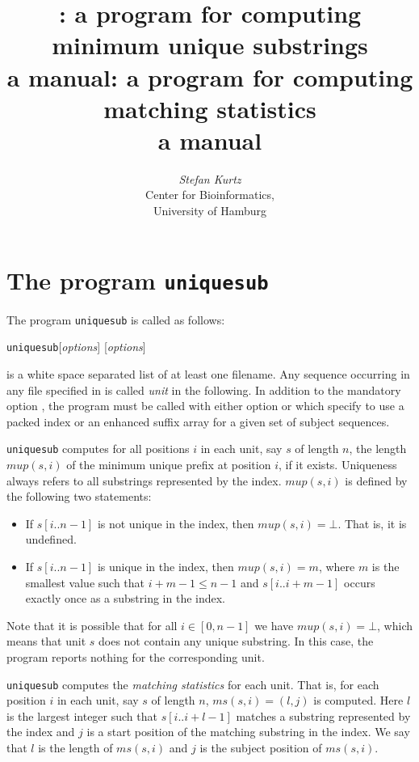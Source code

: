 \documentclass[12pt]{article}
\title{\Program: a program for computing\\
       minimum unique substrings\\
       a manual}
\title{\Program: a program for computing\\
       matching statistics\\
       a manual}
\author{\begin{tabular}{c}
         \textit{Stefan Kurtz}\\
         Center for Bioinformatics,\\
         University of Hamburg
        \end{tabular}}
\newcommand{\Substring}[3]{#1[#2..#3]}
\newcommand{\Program}[0]{\texttt{uniquesub}\xspace}
\newcommand{\Mup}[1]{\mathit{mup(s,#1)}}
\newcommand{\Program}[0]{\texttt{matstat}\xspace}
\newcommand{\MS}[1]{\mathit{ms(s,#1)}}
\begin{document}
\maketitle

\section{The program \Program}

The program \Program is called as follows:
\par
\noindent\Program [\textit{options}]   [\textit{options}] 
\par
{} is a white space separated list of at least one 
filename. Any sequence occurring in any file specified in 
is called \textit{unit} in the following.
In addition to the mandatory option , the program
must be called with either option  or 
which specify to use a packed index or an enhanced suffix array for 
a given set of subject sequences.

\begin{AboutUniquesub}
\Program computes for all positions \(i\) in each unit, say \(s\) of length
\(n\), the length \(\Mup{i}\) of the minimum unique prefix 
at position \(i\), if it exists. Uniqueness always refers to all substrings
represented by the index. \(\Mup{i}\) is defined by the following two 
statements:
\begin{itemize}
\item
If \(\Substring{s}{i}{n-1}\) is not unique in the index, then \(\Mup{i}=\bot\).
That is, it is undefined.
\item
If \(\Substring{s}{i}{n-1}\) is unique in the index, then \(\Mup{i}=m\), where 
\(m\) is the smallest value such that \(i+m-1\leq n-1\) and 
\(\Substring{s}{i}{i+m-1}\) occurs exactly once as a substring in the index.
\end{itemize}
Note that it is possible that for all \(i\in[0,n-1]\) we have 
\(\Mup{i}=\bot\), which means that unit \(s\) does not contain any unique 
substring. In this case, the program reports nothing for the corresponding
unit.
\end{AboutUniquesub}
\begin{AboutMatstat}
\Program computes the  \textit{matching statistics} for each unit. That is, 
for each position \(i\) in 
each unit, say \(s\) of length \(n\), \(\MS{i}=(l,j)\) is computed. Here
\(l\) is the largest integer such that \(\Substring{s}{i}{i+l-1}\) matches
a substring represented by the index and \(j\) is a start position of the
matching substring in the index. We say that \(l\) is the length of \(\MS{i}\)
and \(j\) is the subject position of \(\MS{i}\).
\end{AboutMatstat}
\end{document}
